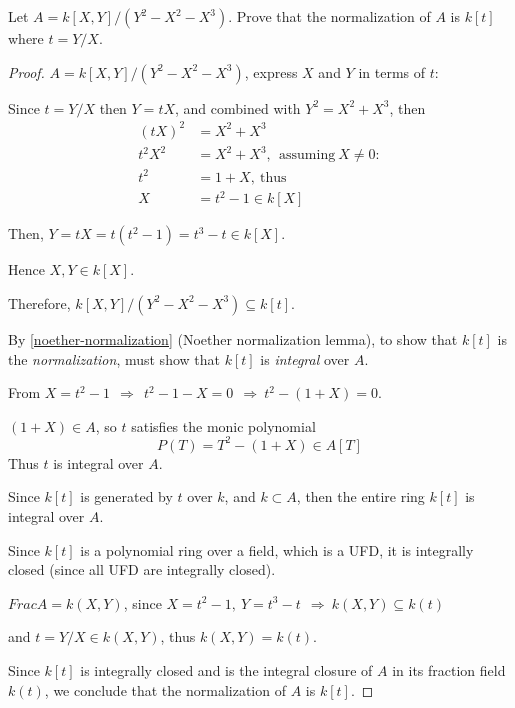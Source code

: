 \documentclass{article}
\theoremstyle{definition}
\newenvironment{ex}[1]
{\renewcommand\theinnerex{#1}\innerex}
{\endinnerex}
\begin{document}
\begin{ex}{R.4.5}
  Let $A=k[X,Y]/(Y^2 - X^2 - X^3)$. Prove that the normalization of $A$ is $k[t]$ where $t=Y/X$.
\end{ex}
\begin{proof}
$A=k[X,Y]/(Y^2 - X^2 - X^3)$, express $X$ and $Y$ in terms of $t$:

Since $t=Y/X$ then $Y=tX$, and combined with $Y^2 = X^2 + X^3$, then
\begin{align*}
  (tX)^2 &= X^2 + X^3\\
  t^2 X^2 &= X^2 + X^3, ~~\text{assuming}~X \neq 0:\\
  t^2 &= 1+X, ~\text{thus}\\
  X&=t^2-1 \in k[X]
\end{align*}

Then, $Y=tX=t(t^2-1)=t^3-t \in k[X]$.

Hence $X, Y \in k[X]$.

Therefore, $k[X,Y]/(Y^2 - X^2 - X^3) \subseteq k[t]$.

\vspace{0.4cm}
By \ref{noether-normalization} (Noether normalization lemma), to show that $k[t]$ is the \emph{normalization}, must show that $k[t]$ is \emph{integral} over $A$.

From $X=t^2-1 ~~\Longrightarrow~~ t^2-1-X=0 ~~\Longrightarrow~ t^2 - (1+X) = 0$.

$(1+X) \in A$, so $t$ satisfies the monic polynomial
$$P(T) = T^2 - (1+X) \in A[T]$$
Thus $t$ is integral over $A$.

Since $k[t]$ is generated by $t$ over $k$, and $k \subset A$, then the entire ring $k[t]$ is integral over $A$.

Since $k[t]$ is a polynomial ring over a field, which is a UFD, it is integrally closed (since all UFD are integrally closed).

$Frac A = k(X,Y)$, since $X=t^2-1, ~Y=t^3-t ~~\Longrightarrow~ k(X,Y) \subseteq k(t)$

and $t=Y/X \in k(X,Y)$, thus $k(X,Y)=k(t)$.

Since $k[t]$ is integrally closed and is the integral closure of $A$ in its fraction field $k(t)$, we conclude that the normalization of $A$ is $k[t]$.
\end{proof}
\end{document}
